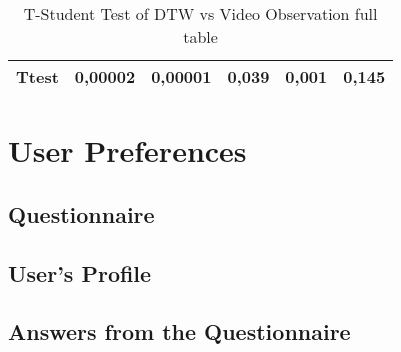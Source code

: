 \begin{table}[]
{\begin{tabular}{ccccccccccc}
\multicolumn{1}{|c|}{\textbf{Ttest}}    & \multicolumn{2}{c|}{0,00002}                                                 & \multicolumn{2}{c|}{0,00001}                                                 & \multicolumn{2}{c|}{0,039}                                                   & \multicolumn{2}{c|}{0,001}                                                   & \multicolumn{2}{c|}{0,145}                                                   \\ \hline
\end{tabular}
}
\caption{T-Student Test of DTW vs Video Observation full table}
\label{table:ttestfull}
\end{table}



\chapter{User Preferences}

\section{Questionnaire}
\label{appendix_questionnaire}

\begin{center}

\end{center}

\section{User's Profile}

\section{Answers from the Questionnaire}